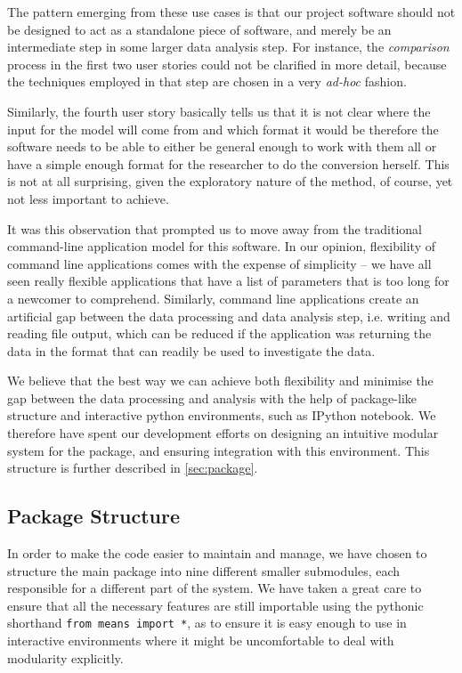 The pattern emerging from these use cases is that our project software should not be designed to act as a standalone piece of software, and merely be an intermediate step in some larger data analysis step. For instance, the \emph{comparison} process in the first two user stories could not be clarified in more detail, because the techniques employed in that step are chosen in a very \emph{ad-hoc} fashion. 

Similarly, the fourth user story basically tells us that it is not clear where the input for the model will come from and which format it would be therefore the software needs to be able to either be general enough to work with them all or have a simple enough format for the researcher to do the conversion herself. 
This is not at all surprising, given the exploratory nature of the method, of course, yet not less important to achieve. 

It was this observation that prompted us to move away from the traditional command-line application model for this software. 
In our opinion, flexibility of command line applications comes with the expense of simplicity -- we have all seen really flexible applications that have a list of parameters that is too long for a newcomer to comprehend. Similarly, command line applications create an artificial gap between the data processing and data analysis step, i.e. writing and reading file output, which can be reduced if the application was returning the data in the format that can readily be used to investigate the data.

We believe that the best way we can achieve both flexibility and minimise the gap between the data processing and analysis with the help of package-like structure and interactive python environments, such as IPython notebook.
We therefore have spent our development efforts on designing an intuitive modular system for the package, and ensuring integration with this environment. This structure is further described in \autoref{sec:package}.

\subsection{Package Structure}
\label{sec:package}

In order to make the code easier to maintain and manage, we have chosen to structure the main \means  package into nine different smaller submodules, each responsible for a different part of the system. We have taken a great care to ensure that all the necessary features are still importable using the pythonic shorthand \verb"from means import *", as to ensure it is easy enough to use in interactive environments where it might be uncomfortable to deal with modularity explicitly.

